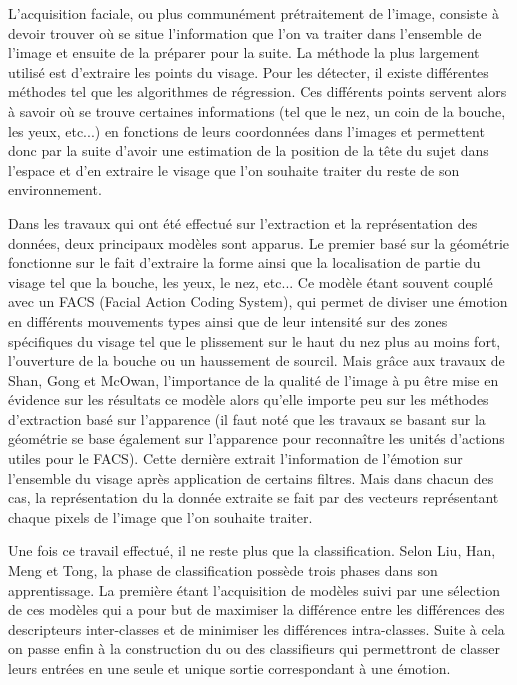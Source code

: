 \documentclass[12pt]{article}
\newcommand{\benjamin}[1]{\textcolor{red}{#1}}
\begin{document}

L'acquisition faciale, ou plus communément prétraitement de l'image, consiste à devoir trouver où se situe l'information que l'on va traiter dans l'ensemble de l'image et ensuite de la préparer pour la suite. La méthode la plus largement utilisé est d'extraire les points du visage. Pour les détecter, il existe différentes méthodes tel que les algorithmes de régression\cite{art1}. Ces différents points servent alors à savoir où se trouve certaines informations (tel que le nez, un coin de la bouche, les yeux, etc...) en fonctions de leurs coordonnées dans l'images et permettent donc par la suite d'avoir une estimation de la position de la tête du sujet dans l'espace et d'en extraire le visage que l'on souhaite traiter du reste de son environnement.

Dans les travaux qui ont été effectué sur l'extraction et la représentation des données, deux principaux modèles sont apparus. Le premier basé sur la géométrie fonctionne sur le fait d'extraire la forme ainsi que la localisation de partie du visage tel que la bouche, les yeux, le nez, etc... Ce modèle étant souvent couplé avec un FACS (Facial Action Coding System), qui permet de diviser une émotion en différents mouvements types ainsi que de leur intensité sur des zones spécifiques du visage tel que le plissement sur le haut du nez plus au moins fort, l'ouverture de la bouche ou un haussement de sourcil. Mais grâce aux travaux de Shan, Gong et McOwan\cite{ShanGongMc}, l'importance de la qualité de l'image à pu être mise en évidence sur les résultats ce modèle alors qu'elle importe peu sur les méthodes d'extraction basé sur l'apparence (il faut noté que les travaux se basant sur la géométrie se base également sur l'apparence pour reconnaître les unités d'actions utiles pour le FACS). Cette dernière extrait l'information de l'émotion sur l'ensemble du visage après application de certains filtres. Mais dans chacun des cas, la représentation du la donnée extraite se fait par des vecteurs représentant chaque pixels de l'image que l'on souhaite traiter.

Une fois ce travail effectué, il ne reste plus que la classification. Selon Liu, Han, Meng et Tong\cite{LiuHanMengTong}, la phase de classification possède trois phases dans son apprentissage. La première étant l'acquisition de modèles suivi par une sélection de ces modèles qui a pour but de maximiser la différence entre les différences des descripteurs inter-classes et de minimiser les différences intra-classes. Suite à cela on passe enfin à la construction du ou des classifieurs qui permettront de classer leurs entrées en une seule et unique sortie correspondant à une émotion.
\end{document}
